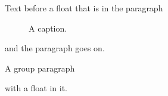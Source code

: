 \documentclass{article}
\begin{document}
\bigskip
Text before a float that is in the paragraph
\begin{figure}[t]
\centering
\caption{A caption.}
\end{figure}
and the paragraph goes on.

{\large A group paragraph
\begin{table}[h]
\caption{Another.}
\end{table}
with a float in it.\par}
\end{document}
